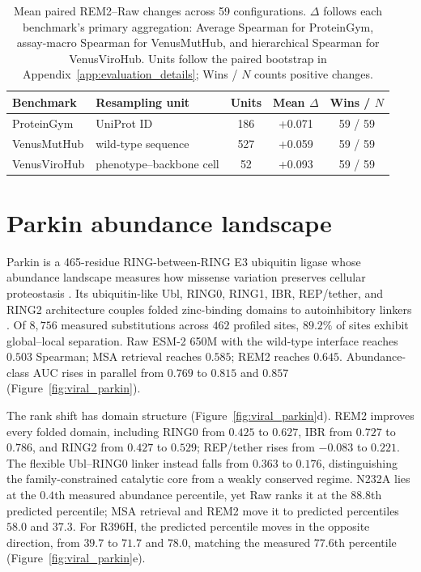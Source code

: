 \documentclass{article} %
\begin{document}
\begin{table}[!ht]
\caption{Mean paired \textsc{REM2}--Raw changes across 59 configurations. $\Delta$ follows each benchmark's primary aggregation: Average Spearman for ProteinGym, assay-macro Spearman for VenusMutHub, and hierarchical Spearman for VenusViroHub. Units follow the paired bootstrap in Appendix~\ref{app:evaluation_details}; Wins / $N$ counts positive changes.}
\label{tab:bootstrap}
\begin{center}
\small
\setlength{\tabcolsep}{4pt}
\begin{tabular}{llccc}
\toprule
Benchmark & Resampling unit & Units & Mean $\Delta$ & Wins / $N$ \\
\midrule
ProteinGym & UniProt ID & 186 & +0.071 & 59 / 59 \\
VenusMutHub & wild-type sequence & 527 & +0.059 & 59 / 59 \\
VenusViroHub & phenotype--backbone cell & 52 & +0.093 & 59 / 59 \\
\bottomrule
\end{tabular}
\end{center}
\end{table}

\FloatBarrier
\section{Parkin abundance landscape}
\label{app:parkin_details}

Parkin is a 465-residue RING-between-RING E3 ubiquitin ligase whose abundance landscape measures how missense variation preserves cellular proteostasis \citep{clausen2024parkin}. Its ubiquitin-like Ubl, RING0, RING1, IBR, REP/tether, and RING2 architecture couples folded zinc-binding domains to autoinhibitory linkers \citep{kumar2015parkin}. Of $8{,}756$ measured substitutions across $462$ profiled sites, $89.2\%$ of sites exhibit global--local separation. Raw \textsc{ESM-2} 650M with the wild-type interface reaches $0.503$ Spearman; MSA retrieval reaches $0.585$; \textsc{REM2} reaches $0.645$. Abundance-class AUC rises in parallel from $0.769$ to $0.815$ and $0.857$ (Figure~\ref{fig:viral_parkin}).

The rank shift has domain structure (Figure~\ref{fig:viral_parkin}d). \textsc{REM2} improves every folded domain, including RING0 from $0.425$ to $0.627$, IBR from $0.727$ to $0.786$, and RING2 from $0.427$ to $0.529$; REP/tether rises from $-0.083$ to $0.221$. The flexible Ubl--RING0 linker instead falls from $0.363$ to $0.176$, distinguishing the family-constrained catalytic core from a weakly conserved regime. N232A lies at the $0.4$th measured abundance percentile, yet Raw ranks it at the $88.8$th predicted percentile; MSA retrieval and \textsc{REM2} move it to predicted percentiles $58.0$ and $37.3$. For R396H, the predicted percentile moves in the opposite direction, from $39.7$ to $71.7$ and $78.0$, matching the measured $77.6$th percentile (Figure~\ref{fig:viral_parkin}e).
\end{document}
